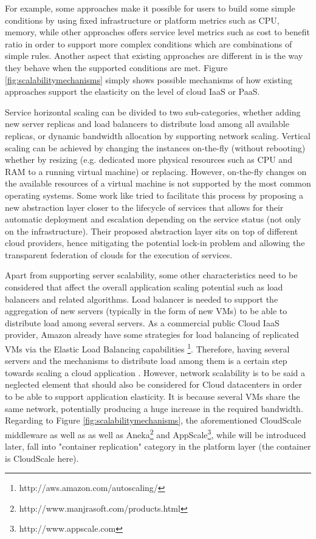 \documentclass{sig-alternate}
\begin{document}
For example, some approaches make it possible for users to build some simple conditions by using fixed infrastructure or platform metrics such as CPU, memory, while other approaches offers service level metrics such as cost to benefit ratio in order to support more complex conditions which are combinations of simple rules.
Another aspect that existing approaches are different in is the way they behave when the supported conditions are met. Figure \ref{fig:scalabilitymechanisms}\cite{vaquero2011dynamically} simply shows possible mechanisms of how existing approaches support the elasticity on the level of cloud IaaS or PaaS.

Service horizontal scaling can be divided to two sub-categories, whether adding new server replicas and load balancers to distribute load among all available replicas, or dynamic bandwidth allocation by supporting network scaling. Vertical scaling can be achieved by changing the instances on-the-fly (without rebooting) whether by resizing (e.g. dedicated more physical resources such as CPU and RAM to a running virtual machine) or replacing. However, on-the-fly changes on the available resources of a virtual machine is not supported by the most common operating systems. Some work like \cite{rodero2010infrastructure} tried to facilitate this process by proposing a new abstraction layer closer to the lifecycle of services that allows for their automatic deployment and escalation depending on the service status (not only on the infrastructure). Their proposed abstraction layer sits on top of different cloud providers, hence mitigating the potential lock-in problem and allowing the transparent federation of clouds for the execution of services.

Apart from supporting server scalability, some other characteristics need to be considered that affect the overall application scaling potential such as load balancers and related algorithms. Load balancer is needed to support the aggregation of new servers (typically in the form of new VMs) to be able to distribute load among several servers. As a commercial public Cloud IaaS provider, Amazon already have some strategies for load balancing of replicated VMs via the Elastic Load Balancing capabilities \footnote{http://aws.amazon.com/autoscaling/}. Therefore, having several servers and the mechanisms to distribute load among them is a certain step towards scaling a cloud application \cite{rodero2010infrastructure}. However, network scalability is to be said a neglected element that should also be considered \cite{wu2009unified} for Cloud datacenters in order to be able to support application elasticity. It is because several VMs share the same network, potentially producing a huge increase in the required bandwidth. 
Regarding to Figure \ref{fig:scalabilitymechanisms}, the aforementioned CloudScale middleware as well as as well as Aneka\footnote{http://www.manjrasoft.com/products.html} and AppScale\footnote{http://www.appscale.com}, while will be introduced later, fall into "container replication" category in the platform layer (the container is CloudScale here).
\end{document}
